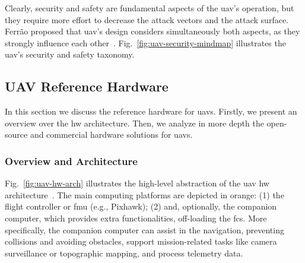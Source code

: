 Clearly, security and safety are fundamental aspects of the \gls{uav}'s
operation, but they require more effort to decrease the attack vectors and the
attack surface. Ferrão proposed that \gls{uav}'s design considers simultaneously
both aspects, as they strongly influence each
other~\cite{ferrao2020stuart}. Fig.~\ref{fig:uav-security-mindmap} illustrates the
\gls{uav}'s security and safety taxonomy.

\subsection{UAV Reference Hardware}%
\label{sec:uav-ref-hw}
In this section we discuss the reference hardware for \glspl{uav}.
Firstly, we present an overview over the \gls{hw} architecture. Then, we analyze
in more depth the open-source and commercial hardware solutions for \glspl{uav}.

\subsubsection{Overview and Architecture}%
\label{sec:overv-arch-hw}
Fig.~\ref{fig:uav-hw-arch} illustrates the high-level abstraction of the
\gls{uav} \gls{hw} architecture~\cite{leccadito2018survey,px4-sysArch}. The main
computing platforms are depicted in orange: (1) the flight controller or
\gls{fmu} (e.g., Pixhawk); (2) and, optionally,
the companion computer, which provides extra functionalities, off-loading the \gls{fcs}. More specifically, the companion computer can assist in the
navigation, preventing collisions and avoiding obstacles, support
mission-related tasks like camera surveillance or topographic mapping, and
process telemetry data.


